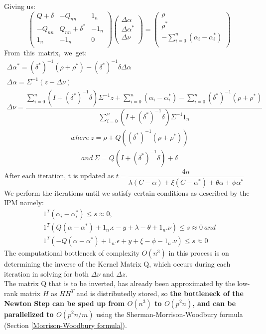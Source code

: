 \documentclass[12pt]{article}
\begin{document}
 Giving us:
 \[
\begin{pmatrix} 
Q+\delta&-Q_{nn}&1_{n}\\
-Q_{nn}&Q_{nn} + \delta^*&-1_{n}\\
1_{n}&-1_{n}&0\\
\end{pmatrix}
\begin{pmatrix} 
\Delta \alpha\\
\Delta \alpha^*\\
\Delta\nu\\
\end{pmatrix}
=
\begin{pmatrix} 
\rho\\
\rho^*\\
-\sum_{i=0}^{n}{(\alpha_{i} - \alpha_{i}^*)}\\
\end{pmatrix}
\]
\belowdisplayskip=0pt
From\ this\ matrix,\ we\ get:\\
 \begin{gather}
\Delta\alpha^*=(\delta^*)^{-1}(\rho + \rho^*) - (\delta^*)^{-1}\delta\Delta\alpha\\
\Delta\alpha=\Sigma^{-1}(z - \Delta\nu)\\
\Delta\nu = \dfrac{\sum_{i=0}^{n}{(I+(\delta^*)^{-1}\delta)\Sigma^{-1}z} + \sum_{i=0}^{n}{(\alpha_{i} - \alpha_{i}^*)} - \sum_{i=0}^{n}{(\delta^*)^{-1}(\rho+\rho^*)}}{\sum_{i=0}^{n}{(I+(\delta^*)^{-1}\delta)\Sigma^{-1}1_{n}}}
\end{gather}
\begin{gather*}
where\ z = \rho + Q((\delta^*)^{-1}(\rho + \rho^*))
\end{gather*}
\begin{gather}
and\ \Sigma={Q(I+(\delta^*)^{-1}\delta) + \delta}
 \end{gather}
 \belowdisplayskip=5pt
 After each iteration, t is updated as $t=\dfrac{4n}{\lambda(C-\alpha) + \xi(C-\alpha^*) + \theta\alpha + \phi\alpha^*}$
\newline\newline
 We perform the iterations until we satisfy certain conditions as described by the IPM namely:
  \begin{gather*}
1^T(\alpha_{i} - \alpha_{i}^*) \leq s \approx 0, \\
1^T(Q(\alpha - \alpha^*) + 1_{n}.\epsilon - y + \lambda - \theta + 1_{n}.\nu) \leq s \approx 0\ and \\
1^T( -Q(\alpha - \alpha^*) + 1_{n}.\epsilon + y + \xi - \phi - 1_{n}.\nu) \leq s \approx 0
 \end{gather*}
 The computational bottleneck of complexity $O(n^3)$ in this process is on determining the inverse of the Kernel Matrix Q, which occurs during each iteration in solving for both $\Delta \nu$ and $\Delta z$. \\
The matrix Q that is to be inverted, has already been approximated by the low-rank matrix $H$ as $HH^T$ and is distributedly stored, so  {\bf  the bottleneck of the Newton Step can be sped up from $O(n^3)$ to $O(p^2n)$, and can be parallelized to $O(p^2n/m)$} using the Sherman-Morrison-Woodbury formula (Section \ref{Morrison-Woodbury formula}).
\end{document}
